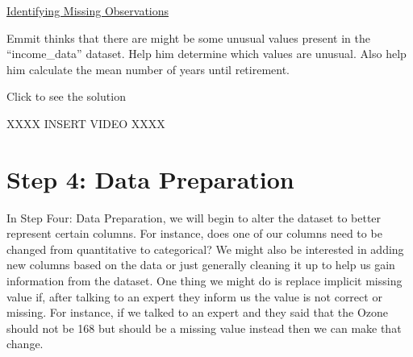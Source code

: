 \documentclass[
  letterpaper,
  DIV=11,
  numbers=noendperiod]{scrreprt}
\newenvironment{Shaded}{\begin{snugshade}}{\end{snugshade}}
\newcommand{\AttributeTok}[1]{\textcolor[rgb]{0.40,0.45,0.13}{#1}}
\newcommand{\ConstantTok}[1]{\textcolor[rgb]{0.56,0.35,0.01}{#1}}
\newcommand{\DecValTok}[1]{\textcolor[rgb]{0.68,0.00,0.00}{#1}}
\newcommand{\FunctionTok}[1]{\textcolor[rgb]{0.28,0.35,0.67}{#1}}
\newcommand{\NormalTok}[1]{\textcolor[rgb]{0.00,0.23,0.31}{#1}}
\newcommand{\OtherTok}[1]{\textcolor[rgb]{0.00,0.23,0.31}{#1}}
\newcommand{\SpecialCharTok}[1]{\textcolor[rgb]{0.37,0.37,0.37}{#1}}
\begin{document}
\begin{watch}{}{}
    \href{https://youtu.be/Qqs3RrHd4xQ}{Identifying Missing Observations}
\end{watch}

\begin{tcolorbox}[enhanced jigsaw, colbacktitle=quarto-callout-tip-color!10!white, breakable, bottomrule=.15mm, colframe=quarto-callout-tip-color-frame, left=2mm, opacitybacktitle=0.6, title=\textcolor{quarto-callout-tip-color}{\faLightbulb}\hspace{0.5em}{Try it Out}, leftrule=.75mm, opacityback=0, rightrule=.15mm, titlerule=0mm, bottomtitle=1mm, colback=white, toprule=.15mm, arc=.35mm, toptitle=1mm, coltitle=black]

Emmit thinks that there are might be some unusual values present in the
``income\_data'' dataset. Help him determine which values are unusual.
Also help him calculate the mean number of years until retirement.

Click to see the solution

XXXX INSERT VIDEO XXXX

\end{tcolorbox}

\section{Step 4: Data Preparation}\label{step-4-data-preparation}

In Step Four: Data Preparation, we will begin to alter the dataset to
better represent certain columns. For instance, does one of our columns
need to be changed from quantitative to categorical? We might also be
interested in adding new columns based on the data or just generally
cleaning it up to help us gain information from the dataset. One thing
we might do is replace implicit missing value if, after talking to an
expert they inform us the value is not correct or missing. For instance,
if we talked to an expert and they said that the Ozone should not be 168
but should be a missing value instead then we can make that change.

\begin{Shaded}
\end{Shaded}
\end{document}
